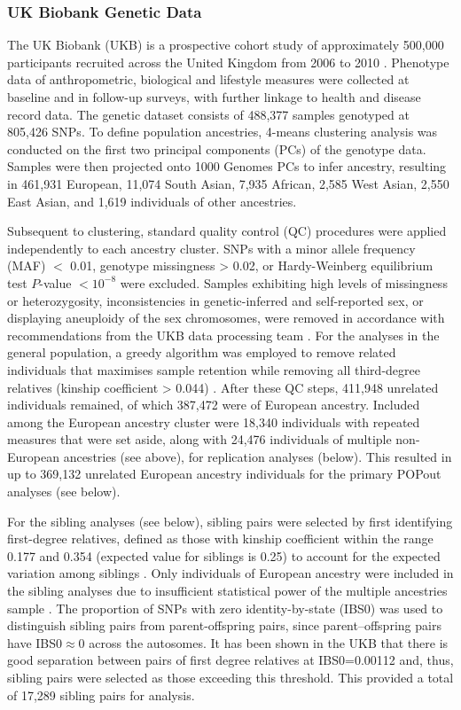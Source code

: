 \documentclass[12pt]{zHenriquesLab-StyleBioRxiv}
\begin{document}
\subsubsection*{UK Biobank Genetic Data} 
The UK Biobank (UKB) is a prospective cohort study of approximately
500,000 participants recruited across the United Kingdom from 2006 to
2010 \cite{ukb}. Phenotype data of anthropometric, biological and
lifestyle measures were collected at baseline and in follow-up surveys, with
further linkage to health and disease record data. The genetic dataset
consists of 488,377 samples genotyped at 805,426 SNPs.
To define population ancestries, 4-means clustering analysis was
conducted on the first two principal components (PCs) of the genotype
data. Samples were then projected onto 1000 Genomes PCs to infer
ancestry, resulting in 461,931 European, 11,074 South Asian, 7,935
African, 2,585 West Asian, 2,550 East Asian, and 1,619 individuals 
of other ancestries.

Subsequent to clustering, standard quality control (QC) procedures
were applied independently to each ancestry cluster. SNPs with a minor
allele frequency (MAF) $<$ 0.01, genotype missingness > 0.02, or
Hardy-Weinberg equilibrium test $P$-value $< 10^{-8}$ were
excluded. Samples exhibiting high levels of missingness or
heterozygosity, inconsistencies in genetic-inferred and self-reported
sex, or displaying aneuploidy of the sex chromosomes, were removed in
accordance with recommendations from the UKB data processing team
\cite{ukb_qc}.  For the analyses in the general population, a greedy
algorithm was employed to remove related individuals that maximises
sample retention while removing all third-degree relatives (kinship
coefficient > 0.044) \cite{erase}.  After these QC steps, 411,948 unrelated    %
individuals remained, of which 387,472 were of European ancestry. Included 
among the European ancestry cluster were 18,340 individuals with repeated 
measures that were set aside, along with 24,476 individuals of multiple 
non-European ancestries (see above), for replication analyses (below). This resulted in up to 369,132 
unrelated European ancestry individuals for the primary POPout analyses (see below). 

For the sibling analyses (see below), sibling pairs were selected by first
identifying first-degree relatives, defined as those with kinship
coefficient within the range 0.177 and 0.354 (expected value for
siblings is 0.25) to account for the expected variation among siblings \cite{sib1}. 
Only individuals of European ancestry were included in the sibling analyses due to 
insufficient statistical power of the multiple ancestries sample \cite{Souaiaia2024}. 
The proportion of SNPs with zero identity-by-state (IBS0) was used to distinguish 
sibling pairs from parent-offspring pairs, since parent–offspring pairs have
IBS0$\approx$0 across the autosomes. It has been shown in the UKB that
there is good separation between pairs of first degree relatives at
IBS0=0.00112 \cite{sib1} and, thus, sibling pairs were selected as
those exceeding this threshold. This provided a total of 17,289 sibling pairs 
for analysis.
\end{document}
